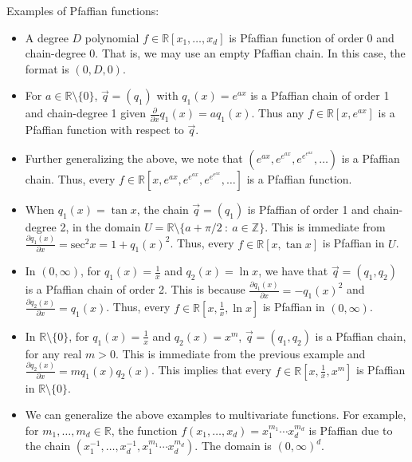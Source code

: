 \documentclass[11pt]{article}
\theoremstyle{definition}
\newcommand{\RR}{\mathbb R}
\newcommand{\ZZ}{\mathbb Z}
\begin{document}
Examples of Pfaffian functions:
\begin{itemize}[itemsep=1pt,topsep=1pt]
\item A degree $D$ polynomial $f\in \RR[x_1, \ldots, x_d]$ is Pfaffian function of order 0 and chain-degree 0. 
That is, we may use an empty Pfaffian chain.
In this case, the format is $(0,D,0)$.
\item For $a\in \RR\setminus\{0\}$, $\vec{q} = (q_1)$ with $q_1(x)=e^{ax}$ is a Pfaffian chain of order 1 and chain-degree 1 given $\frac{\partial}{\partial x} q_1(x) = a q_1(x)$. Thus any $f \in \RR[x, e^{ax}]$ is a Pfaffian function with respect to $\vec{q}$.
\item Further generalizing the above, we note that $(e^{ax},e^{e^{ax}}, e^{e^{e^{ax}}},\ldots)$ is a Pfaffian chain. 
Thus, every $f\in \RR[x,e^{ax},e^{e^{ax}}, e^{e^{e^{ax}}},\ldots]$ is a Pfaffian function.
\item When $q_1(x) = \tan x$, the chain $\vec{q} = (q_1)$ is Pfaffian of order 1 and chain-degree 2, in the domain $U=\RR\setminus \{a+\pi/2\ :\ a\in\ZZ\}$. This is immediate from $\frac{\partial q_1(x)}{\partial x} = \mathrm{sec}^2 x = 1+q_1(x)^2$. Thus, every $f\in \RR[x, \tan x]$ is Pfaffian in $U$.
\item In $(0,\infty)$, for $q_1(x) = \frac{1}{x}$ and $q_2(x) = \ln x$, we have that $\vec{q} = (q_1, q_2)$ is a Pfaffian chain of order 2.
This is because $\frac{\partial q_1(x)}{\partial x} = -q_1(x)^2$ and $\frac{\partial q_2(x)}{\partial x} = q_1(x)$.
Thus, every $f\in \RR[x, \frac{1}{x}, \ln x]$ is Pfaffian in $(0,\infty)$.
\item In $\RR\setminus \{0\}$, for $q_1(x) = \frac{1}{x}$ and $q_2(x) = x^m$, $\vec{q} = (q_1, q_2)$ is a Pfaffian chain, for any real $m>0$.
This is immediate from the previous example and $\frac{\partial q_2(x)}{\partial x} = m q_1(x) q_2(x)$.
This implies that every $f\in\RR[x,\frac{1}{x},x^m]$ is Pfaffian in $\RR\setminus \{0\}$.
\item We can generalize the above examples to multivariate functions. 
For example, for $m_1,\ldots,m_d\in \RR$, the function $f(x_1,\ldots,x_d) = x_1^{m_1}\cdots x_d^{m_d}$ is Pfaffian due to the chain $(x_1^{-1},\ldots,x_d^{-1},x_1^{m_1}\cdots x_d^{m_d})$. The domain is $(0,\infty)^d$.
\end{itemize}
\end{document}
